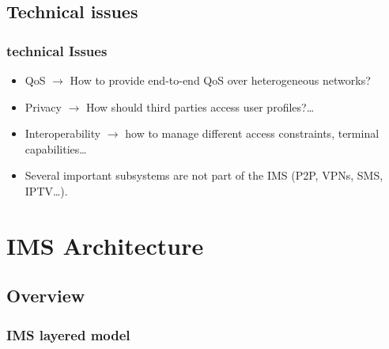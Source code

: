 \documentclass[pdf]{beamer}
\begin{document}
   \subsection{Technical issues}
        \begin{frame}
        \frametitle{technical Issues} 
            \begin{itemize}
                \item QoS $\rightarrow$ How to provide end-to-end QoS over heterogeneous networks?
                \item Privacy $\rightarrow$ How should third parties access user profiles?\ldots   
                \item Interoperability $\rightarrow$ how to manage different access constraints,
 terminal capabilities\ldots
                \item Several important subsystems are not part of the IMS (P2P, VPNs, SMS, IPTV\ldots).
            \end{itemize}
        \end{frame}     




\section{IMS Architecture}
    \subsection{Overview}
    \begin{frame}
        \frametitle{IMS layered model}
        \begin{overprint}
        \end{overprint} 
    \end{frame}
   
\end{document}
